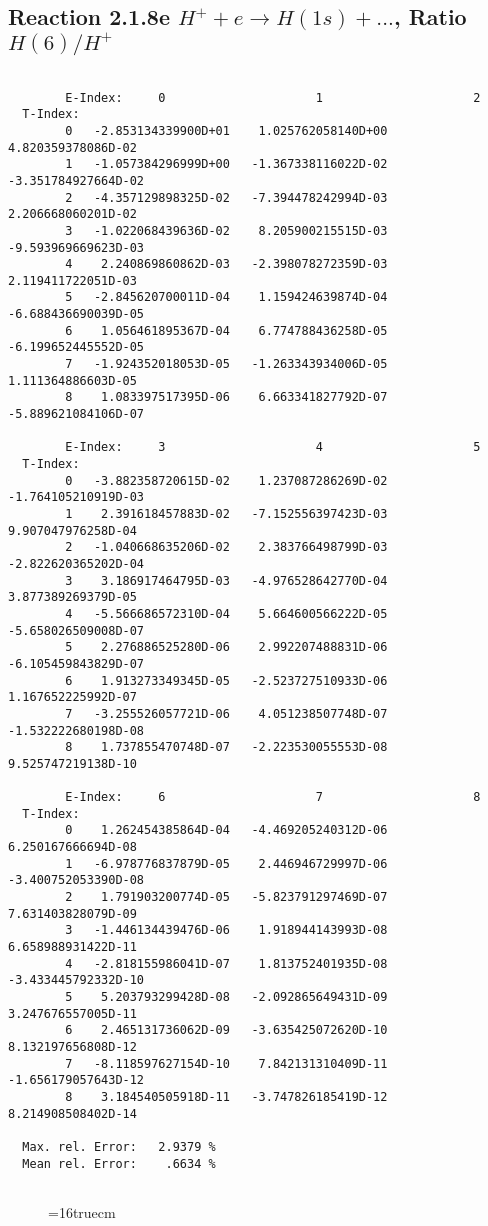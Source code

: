 \documentclass[12pt]{article}
\begin{document}
\subsection{
Reaction 2.1.8e  $H^+ + e \rightarrow H(1s) + ...$,  Ratio $H(6)/H^+$
}

\begin{small}\begin{verbatim}

        E-Index:     0                     1                     2
  T-Index:
        0   -2.853134339900D+01    1.025762058140D+00    4.820359378086D-02
        1   -1.057384296999D+00   -1.367338116022D-02   -3.351784927664D-02
        2   -4.357129898325D-02   -7.394478242994D-03    2.206668060201D-02
        3   -1.022068439636D-02    8.205900215515D-03   -9.593969669623D-03
        4    2.240869860862D-03   -2.398078272359D-03    2.119411722051D-03
        5   -2.845620700011D-04    1.159424639874D-04   -6.688436690039D-05
        6    1.056461895367D-04    6.774788436258D-05   -6.199652445552D-05
        7   -1.924352018053D-05   -1.263343934006D-05    1.111364886603D-05
        8    1.083397517395D-06    6.663341827792D-07   -5.889621084106D-07

        E-Index:     3                     4                     5
  T-Index:
        0   -3.882358720615D-02    1.237087286269D-02   -1.764105210919D-03
        1    2.391618457883D-02   -7.152556397423D-03    9.907047976258D-04
        2   -1.040668635206D-02    2.383766498799D-03   -2.822620365202D-04
        3    3.186917464795D-03   -4.976528642770D-04    3.877389269379D-05
        4   -5.566686572310D-04    5.664600566222D-05   -5.658026509008D-07
        5    2.276886525280D-06    2.992207488831D-06   -6.105459843829D-07
        6    1.913273349345D-05   -2.523727510933D-06    1.167652225992D-07
        7   -3.255526057721D-06    4.051238507748D-07   -1.532222680198D-08
        8    1.737855470748D-07   -2.223530055553D-08    9.525747219138D-10

        E-Index:     6                     7                     8
  T-Index:
        0    1.262454385864D-04   -4.469205240312D-06    6.250167666694D-08
        1   -6.978776837879D-05    2.446946729997D-06   -3.400752053390D-08
        2    1.791903200774D-05   -5.823791297469D-07    7.631403828079D-09
        3   -1.446134439476D-06    1.918944143993D-08    6.658988931422D-11
        4   -2.818155986041D-07    1.813752401935D-08   -3.433445792332D-10
        5    5.203793299428D-08   -2.092865649431D-09    3.247676557005D-11
        6    2.465131736062D-09   -3.635425072620D-10    8.132197656808D-12
        7   -8.118597627154D-10    7.842131310409D-11   -1.656179057643D-12
        8    3.184540505918D-11   -3.747826185419D-12    8.214908508402D-14

  Max. rel. Error:   2.9379 %
  Mean rel. Error:    .6634 %


\end{verbatim}\end{small}
\begin{figure} \label{2.1.8re}
\epsfxsize=16truecm
\end{figure}
\newpage
\end{document}
